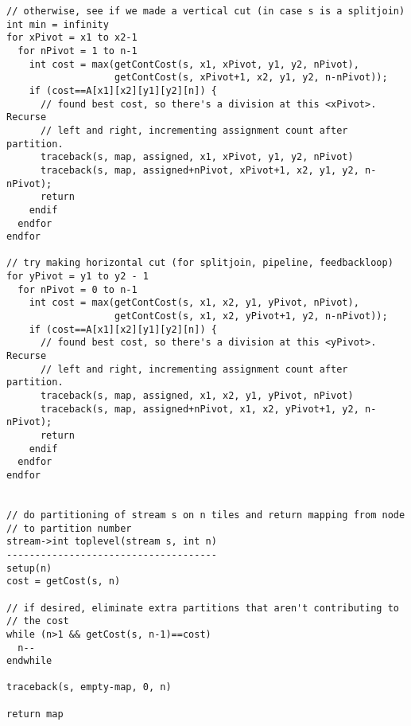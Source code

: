 \begin{verbatim}
// otherwise, see if we made a vertical cut (in case s is a splitjoin)
int min = infinity
for xPivot = x1 to x2-1
  for nPivot = 1 to n-1
    int cost = max(getContCost(s, x1, xPivot, y1, y2, nPivot),
                   getContCost(s, xPivot+1, x2, y1, y2, n-nPivot));
    if (cost==A[x1][x2][y1][y2][n]) {
      // found best cost, so there's a division at this <xPivot>.  Recurse
      // left and right, incrementing assignment count after partition.
      traceback(s, map, assigned, x1, xPivot, y1, y2, nPivot)
      traceback(s, map, assigned+nPivot, xPivot+1, x2, y1, y2, n-nPivot);
      return
    endif
  endfor
endfor

// try making horizontal cut (for splitjoin, pipeline, feedbackloop)
for yPivot = y1 to y2 - 1
  for nPivot = 0 to n-1
    int cost = max(getContCost(s, x1, x2, y1, yPivot, nPivot),
                   getContCost(s, x1, x2, yPivot+1, y2, n-nPivot));
    if (cost==A[x1][x2][y1][y2][n]) {
      // found best cost, so there's a division at this <yPivot>.  Recurse
      // left and right, incrementing assignment count after partition.
      traceback(s, map, assigned, x1, x2, y1, yPivot, nPivot)
      traceback(s, map, assigned+nPivot, x1, x2, yPivot+1, y2, n-nPivot);
      return
    endif
  endfor
endfor


// do partitioning of stream s on n tiles and return mapping from node
// to partition number
stream->int toplevel(stream s, int n)
-------------------------------------
setup(n)
cost = getCost(s, n)

// if desired, eliminate extra partitions that aren't contributing to
// the cost
while (n>1 && getCost(s, n-1)==cost)
  n--
endwhile

traceback(s, empty-map, 0, n)

return map

\end{verbatim}
